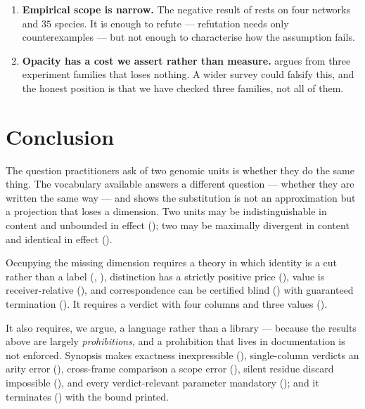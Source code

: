 \documentclass[11pt,twocolumn,a4paper]{article}
\theoremstyle{plain}
\theoremstyle{definition}
\theoremstyle{remark}
\begin{document}
\begin{enumerate}[label=\textbf{L\arabic*.},leftmargin=2.6em]
\item \textbf{Empirical scope is narrow.} The negative result of
       rests on four networks and $35$ species. It is
      enough to refute  --- refutation needs only
      counterexamples --- but not enough to characterise how the
      assumption fails.

\item \textbf{Opacity has a cost we assert rather than measure.}
       argues from three experiment families that
       loses nothing. A wider survey could falsify
      this, and the honest position is that we have checked three
      families, not all of them.
\end{enumerate}

\section{Conclusion}
\label{sec:conc}

The question practitioners ask of two genomic units is whether they do
the same thing. The vocabulary available answers a different question
--- whether they are written the same way --- and  shows
the substitution is not an approximation but a projection that loses a
dimension. Two units may be indistinguishable in content and unbounded
in effect (); two may be maximally divergent in
content and identical in effect ().

Occupying the missing dimension requires a theory in which identity is a
cut rather than a label (, ),
distinction has a strictly positive price (), value is
receiver-relative (), and correspondence can be
certified blind () with guaranteed termination
(). It requires a verdict with four columns and
three values ().

It also requires, we argue, a language rather than a library --- because
the results above are largely \emph{prohibitions}, and a prohibition
that lives in documentation is not enforced. Synopsis makes exactness
inexpressible (), single-column verdicts an arity
error (), cross-frame comparison a scope error
(), silent residue discard impossible
(), and every verdict-relevant parameter mandatory
(); and it terminates () with the
bound printed.
\end{document}

